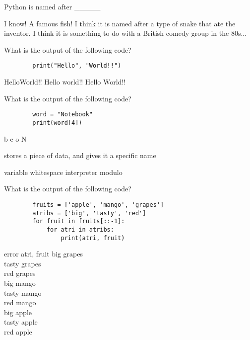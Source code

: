 \documentclass{exam}
\begin{document}
\begin{questions}
    \question Python is named after \_\_\_\_\_

    \begin{oneparchoices}
        \choice I know! A famous fish!
        \choice I think it is named after a type of snake that ate the inventor.
        \choice I think it is something to do with a British comedy group in the 80s...
    \end{oneparchoices}
    \question What is the output of the following code?

    \begin{verbatim}
        print("Hello", "World!!")
    \end{verbatim}
    \begin{oneparchoices}
        \choice HelloWorld!!
        \choice Hello world!!
        \chocie Hello World!!
    \end{oneparchoices}

    \question What is the output of the following code?

    \begin{verbatim}
        word = "Notebook"
        print(word[4])
    \end{verbatim}
    \begin{oneparchoices}
        \choice b
        \choice e
        \choice o
        \choice N
    \end{oneparchoices}

    \question stores a piece of data, and gives it a specific name

    \begin{oneparchoices}
        \choice variable
        \choice whitespace
        \choice interpreter
        \choice modulo
    \end{oneparchoices}
   \question What is the output of the following code?

    \begin{verbatim}
        fruits = ['apple', 'mango', 'grapes']
        atribs = ['big', 'tasty', 'red']
        for fruit in fruits[::-1]:
            for atri in atribs:
                print(atri, fruit)
    \end{verbatim}
    \begin{oneparchoices}
        \choice error
        \choice atri, fruit
        \choice big grapes \\
           tasty grapes \\
           red grapes \\
           big mango \\
           tasty mango \\
           red mango \\
           big apple\\ 
           tasty apple \\
           red apple
    \end{oneparchoices}


\end{questions}
\end{document}
